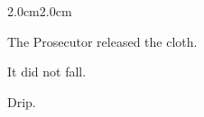 \begin{adjustwidth}{2.0cm}{2.0cm}
\medskip


\medskip

The Prosecutor released the cloth.

\medskip

It did not fall.

\medskip

Drip.

\medskip


\medskip


\end{adjustwidth}
